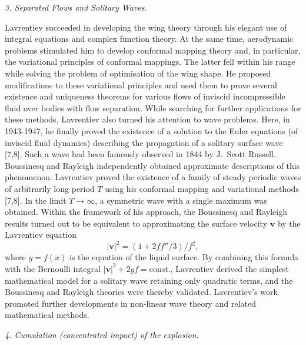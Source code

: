 \documentclass[%
 reprint,
onecolumn,
 amsmath,amssymb, aps,
]{revtex4-2}
\numberwithin{equation}{section}
\newcommand\const{\mathrm{const}}
\newcommand\vv{\boldsymbol{v}}
\begin{document}
\textit{3. Separated Flows and Solitary Waves.}
\vspace{1mm}

Lavrentiev succeeded in developing the wing theory through his elegant use of integral equations and complex function theory.
At the same time, aerodynamic problems stimulated him to develop conformal mapping theory and, in particular, the variational principles of conformal mappings.
The latter fell within his range while solving the problem of optimisation of the wing shape.
He proposed modifications to these variational principles and used them to prove several existence and uniqueness theorems for various flows of inviscid incompressible fluid over bodies with flow separation.
While searching for further applications for these methods, Lavrentiev also turned his attention to wave problems.
 Here, in 1943-1947, he finally proved the existence of a solution to the Euler equations (of inviscid fluid dynamics) describing the propagation of a solitary surface wave [7,8].
 Such a wave had been famously observed in 1844 by J.~Scott Russell.
Boussinesq and Rayleigh independently obtained approximate descriptions of this phenomenon.
 Lavrentiev proved the existence of a family of steady periodic waves of arbitrarily long period $T$ using his conformal mapping and variational methods [7,8].
 In the limit $T\to\infty$,  a symmetric wave with a single maximum was obtained.
Within the framework of his approach, the Boussinesq and Rayleigh results turned out to be equivalent to  approximating the surface velocity $\vv$ by the Lavrentiev equation
\begin{equation}
    |\vv|^2=(1+2f f''/3)/f^2,\nonumber
\end{equation}
where $y=f(x)$ is the equation of the liquid surface.
By combining this formula with the Bernoulli integral $|\vv|^2+2gf=\const.$,  Lavrentiev derived the simplest mathematical model for a solitary wave retaining only quadratic terms, and
the Boussinesq and Rayleigh theories were thereby validated.
Lavrentiev's work promoted further developments in non-linear wave theory and related mathematical methods.
\vspace{3mm}

\textit{4. Cumulation (concentrated impact) of the explosion.}
\vspace{1mm}
\end{document}
